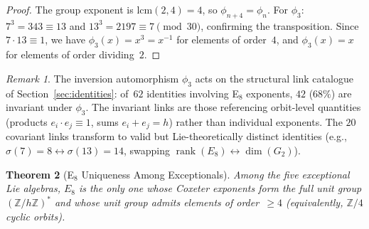 \documentclass[11pt]{amsart}
\theoremstyle{plain}
\newtheorem{theorem}{Theorem}[section]
\theoremstyle{definition}
\theoremstyle{remark}
\newtheorem{remark}[theorem]{Remark}
\newcommand{\rank}{\operatorname{rank}}
\begin{document}
\begin{proof}
The group exponent is $\mathrm{lcm}(2,4) = 4$, so
$\phi_{n+4} = \phi_n$.  For $\phi_3$: $7^3 = 343 \equiv 13$ and
$13^3 = 2197 \equiv 7 \pmod{30}$, confirming the transposition.
Since $7 \cdot 13 \equiv 1$, we have $\phi_3(x) = x^3 = x^{-1}$
for elements of order~$4$, and $\phi_3(x) = x$ for elements of
order dividing~$2$.
\end{proof}

\begin{remark}\label{rem:inversion-duality}
The inversion automorphism $\phi_3$ acts on the structural link
catalogue of Section~\ref{sec:identities}: of~$62$ identities involving
E$_8$ exponents, $42$ ($68\%$) are invariant under $\phi_3$.
The invariant links are those referencing orbit-level quantities
(products $e_i \cdot e_j \equiv 1$, sums $e_i + e_j = h$) rather than
individual exponents.  The $20$ covariant links transform to valid but
Lie-theoretically distinct identities (e.g.,
$\sigma(7) = 8 \leftrightarrow \sigma(13) = 14$, swapping
$\rank(E_8) \leftrightarrow \dim(G_2)$).
\end{remark}

\begin{theorem}[E$_8$ Uniqueness Among Exceptionals]\label{thm:E8-orbit-unique}
Among the five exceptional Lie algebras, $E_8$ is the only one whose
Coxeter exponents form the full unit group $(\mathbb{Z}/h\mathbb{Z})^*$
and whose unit group admits elements of order~$\ge 4$
(equivalently, $\mathbb{Z}/4$ cyclic orbits).
\end{theorem}
\end{document}
